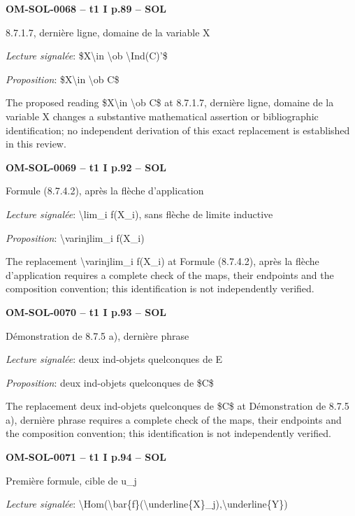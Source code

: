 \par\noindent\textbf{OM-SOL-0068 -- t1 I p.89 -- SOL}\par
8.7.1.7, dernière ligne, domaine de la variable X\par
\emph{Lecture signalée}: \$X\textbackslash{}in \textbackslash{}ob \textbackslash{}Ind(C)'\$\par
\emph{Proposition}: \$X\textbackslash{}in \textbackslash{}ob C\$\par
The proposed reading \$X\textbackslash{}in \textbackslash{}ob C\$ at 8.7.1.7, dernière ligne, domaine de la variable X changes a substantive mathematical assertion or bibliographic identification; no independent derivation of this exact replacement is established in this review.\par
\par\noindent\textbf{OM-SOL-0069 -- t1 I p.92 -- SOL}\par
Formule (8.7.4.2), après la flèche d'application\par
\emph{Lecture signalée}: \textbackslash{}lim\_i f(X\_i), sans flèche de limite inductive\par
\emph{Proposition}: \textbackslash{}varinjlim\_i f(X\_i)\par
The replacement \textbackslash{}varinjlim\_i f(X\_i) at Formule (8.7.4.2), après la flèche d'application requires a complete check of the maps, their endpoints and the composition convention; this identification is not independently verified.\par
\par\noindent\textbf{OM-SOL-0070 -- t1 I p.93 -- SOL}\par
Démonstration de 8.7.5 a), dernière phrase\par
\emph{Lecture signalée}: deux ind-objets quelconques de E\par
\emph{Proposition}: deux ind-objets quelconques de \$C\$\par
The replacement deux ind-objets quelconques de \$C\$ at Démonstration de 8.7.5 a), dernière phrase requires a complete check of the maps, their endpoints and the composition convention; this identification is not independently verified.\par
\par\noindent\textbf{OM-SOL-0071 -- t1 I p.94 -- SOL}\par
Première formule, cible de u\_j\par
\emph{Lecture signalée}: \textbackslash{}Hom(\textbackslash{}bar\{f\}(\textbackslash{}underline\{X\}\_j),\textbackslash{}underline\{Y\})\par
